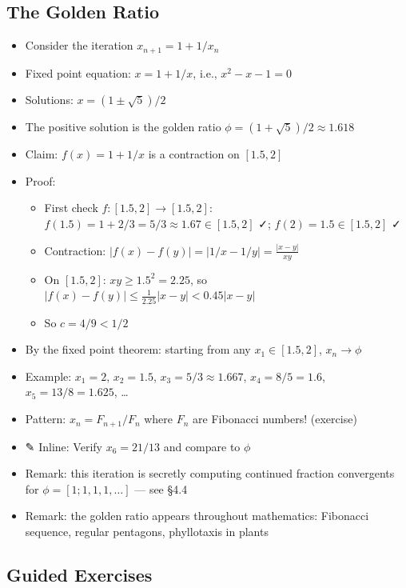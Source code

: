 \documentclass[
  10pt,
  letterpaper,
]{scrbook}
\providecommand{\tightlist}{%
  \setlength{\itemsep}{0pt}\setlength{\parskip}{0pt}}
\begin{document}
\subsection{The Golden Ratio}\label{the-golden-ratio}

\begin{itemize}
\tightlist
\item
  Consider the iteration \(x_{n+1} = 1 + 1/x_n\)
\item
  Fixed point equation: \(x = 1 + 1/x\), i.e., \(x^2 - x - 1 = 0\)
\item
  Solutions: \(x = (1 \pm \sqrt{5})/2\)
\item
  The positive solution is the golden ratio
  \(\phi = (1 + \sqrt{5})/2 \approx 1.618\)
\item
  Claim: \(f(x) = 1 + 1/x\) is a contraction on \([1.5, 2]\)
\item
  Proof:

  \begin{itemize}
  \tightlist
  \item
    First check \(f: [1.5, 2] \to [1.5, 2]\):
    \(f(1.5) = 1 + 2/3 = 5/3 \approx 1.67 \in [1.5, 2]\) ✓;
    \(f(2) = 1.5 \in [1.5, 2]\) ✓
  \item
    Contraction: \(|f(x) - f(y)| = |1/x - 1/y| = \frac{|x - y|}{xy}\)
  \item
    On \([1.5, 2]\): \(xy \geq 1.5^2 = 2.25\), so
    \(|f(x) - f(y)| \leq \frac{1}{2.25}|x - y| < 0.45|x - y|\)
  \item
    So \(c = 4/9 < 1/2\)
  \end{itemize}
\item
  By the fixed point theorem: starting from any \(x_1 \in [1.5, 2]\),
  \(x_n \to \phi\)
\item
  Example: \(x_1 = 2\), \(x_2 = 1.5\), \(x_3 = 5/3 \approx 1.667\),
  \(x_4 = 8/5 = 1.6\), \(x_5 = 13/8 = 1.625\), \ldots{}
\item
  Pattern: \(x_n = F_{n+1}/F_n\) where \(F_n\) are Fibonacci numbers!
  (exercise)
\item
  ✎ Inline: Verify \(x_6 = 21/13\) and compare to \(\phi\)
\item
  Remark: this iteration is secretly computing continued fraction
  convergents for \(\phi = [1; 1, 1, 1, \ldots]\) --- see §4.4
\item
  Remark: the golden ratio appears throughout mathematics: Fibonacci
  sequence, regular pentagons, phyllotaxis in plants
\end{itemize}

\subsection{Guided Exercises}\label{guided-exercises-12}
\end{document}
